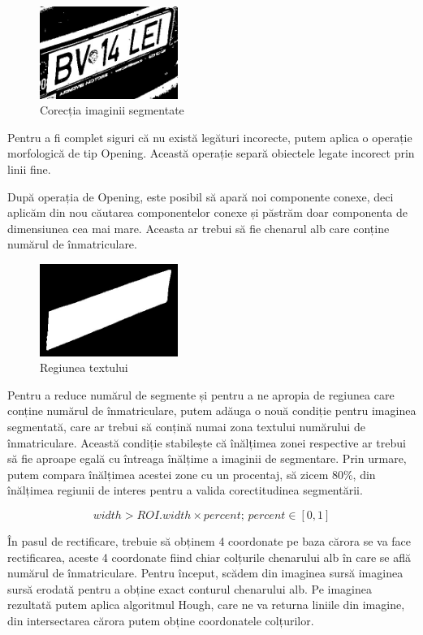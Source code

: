\documentclass[a4paper,12pt]{report}
\begin{document}
\begin{figure}[h]
    \centering
    \includegraphics[width=0.4\textwidth]{images/after_roi.jpg}
    \caption{Corecția imaginii segmentate}
\end{figure}
\FloatBarrier

Pentru a fi complet siguri că nu există legături incorecte, putem aplica o operație morfologică de tip Opening. Această operație separă obiectele legate incorect prin linii fine.

După operația de Opening, este posibil să apară noi componente conexe, deci aplicăm din nou căutarea componentelor conexe și păstrăm doar componenta de dimensiunea cea mai mare. Aceasta ar trebui să fie chenarul alb care conține numărul de înmatriculare.

\begin{figure}[h]
    \centering
    \includegraphics[width=0.4\textwidth]{images/roi.jpg}
    \caption{Regiunea textului}
\end{figure}
\FloatBarrier

Pentru a reduce numărul de segmente și pentru a ne apropia de regiunea care conține numărul de înmatriculare, putem adăuga o nouă condiție pentru imaginea segmentată, care ar trebui să conțină numai zona textului numărului de înmatriculare. Această condiție stabilește că înălțimea zonei respective ar trebui să fie aproape egală cu întreaga înălțime a imaginii de segmentare. Prin urmare, putem compara înălțimea acestei zone cu un procentaj, să zicem 80\%, din înălțimea regiunii de interes pentru a valida corectitudinea segmentării.

\[
    width > ROI.width \times percent; \, percent \in [0, 1]
\]

În pasul de rectificare, trebuie să obținem 4 coordonate pe baza cărora se va face rectificarea, aceste 4 coordonate fiind chiar colțurile chenarului alb în care se află numărul de înmatriculare. Pentru început, scădem din imaginea sursă imaginea sursă erodată pentru a obține exact conturul chenarului alb. Pe imaginea rezultată putem aplica algoritmul Hough, care ne va returna liniile din imagine, din intersectarea cărora putem obține coordonatele colțurilor.
\end{document}
